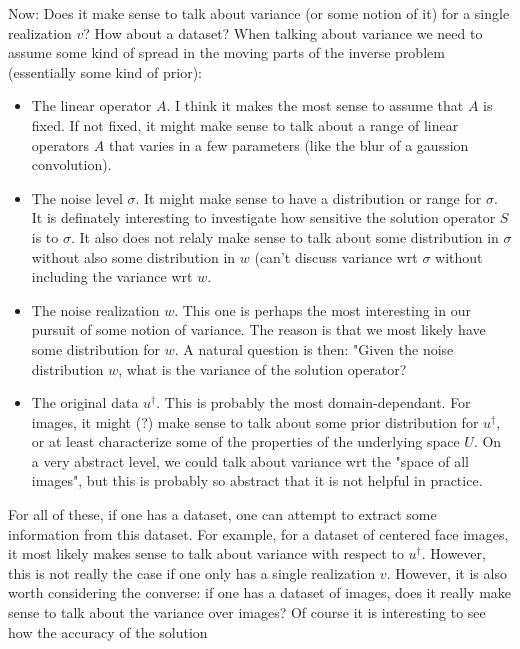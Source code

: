 \documentclass{article}
\begin{document}
Now: Does it make sense to talk about variance (or some notion of it) for a single realization $v$? How about a dataset?
When talking about variance we need to assume some kind of spread in the moving parts of the inverse problem (essentially some kind of prior):
\begin{itemize}
    \item The linear operator $A$. I think it makes the most sense to assume that $A$ is fixed. If not fixed, it might make sense to talk about a range of linear operators $A$ that varies in a few parameters (like the blur of a gaussion convolution).
    \item The noise level $\sigma$. It might make sense to have a distribution or range for $\sigma$. It is definately interesting to investigate how sensitive the solution operator $S$ is to $\sigma$. It also does not relaly make sense to talk about some distribution in $\sigma$ without also some distribution in $w$ (can't discuss variance wrt $\sigma$ without including the variance wrt $w$.
    \item The noise realization $w$. This one is perhaps the most interesting in our pursuit of some notion of variance. The reason is that we most likely have some distribution for $w$. A natural question is then: "Given the noise distribution $w$, what is the variance of the solution operator?
    \item The original data $u^\dagger$. This is probably the most domain-dependant. For images, it might (?) make sense to talk about some prior distribution for $u^\dagger$, or at least characterize some of the properties of the underlying space $U$. On a very abstract level, we could talk about variance wrt the "space of all images", but this is probably so abstract that it is not helpful in practice. 
\end{itemize}
For all of these, if one has a dataset, one can attempt to extract some information from this dataset. For example, for a dataset of centered face images, it most likely makes sense to talk about variance with respect to $u^\dagger$. However, this is not really the case if one only has a single realization $v$. However, it is also worth considering the converse: if one has a dataset of images, does it really make sense to talk about the variance over images? Of course it is interesting to see how the accuracy of the solution
\end{document}
